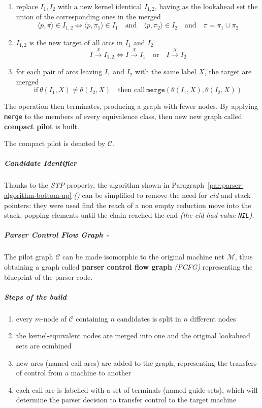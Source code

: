 \documentclass[english]{article}
\begin{document}
\begin{enumerate}
  \item replace \mstates \(I_1, I_2\) with a new kernel identical \mstate \(I_{1,2}\), having as the lookahead set the union of the corresponding ones in the merged \mstates
        \[ \langle p, \pi \rangle \in I_{1, 2} \iff \langle p, \pi_1 \rangle \in I_1 \quad \text{and} \quad \langle p, \pi_2 \rangle \in I_2 \quad \text{and} \quad \pi = \pi_1 \cup \pi_2 \]
  \item \mstate \(I_{1,2}\) is the new target of all arcs in \(I_1\) and \(I_2\)
        \[ I \xrightarrow{X} I_{1,2} \iff I \xrightarrow{X} I_1 \quad \text{or} \quad I \xrightarrow{X} I_2 \]
  \item for each pair of arcs leaving \(I_1\) and \(I_2\) with the same label \(X\), the target \mstates are merged
        \[ \text{if} \ \theta(I_1, X) \neq \theta(I_2, X) \quad \text{then call} \ \texttt{merge}(\theta(I_1, X), \theta(I_2, X)) \]
\end{enumerate}

The operation then terminates, producing a graph with fewer nodes.
By applying \texttt{merge} to the members of every equivalence class, then new new graph called \textbf{compact pilot} is built.

The compact pilot is denoted by \(\mathcal{C}\).

\subparagraph*{Candidate Identifier}

Thanks to the \textit{STP} property, the algorithm shown in Paragraph~\ref{par:parser-algorithm-bottom-up} \textit{()} can be simplified to remove the need for \textit{cid} and stack pointers:
they were used find the reach of a non empty reduction move into the stack, popping elements until the chain reached the end \textit{(the \textit{cid} had value \texttt{NIL})}.

\subparagraph*{Parser Control Flow Graph - \PCFG}

The pilot graph \(\mathcal{C}\) can be made isomorphic to the original machine net \(\mathcal{M}\), thus obtaining a graph called \textbf{parser control flow graph} \textit{(PCFG)} representing the blueprint of the parser code.

\subparagraph*{Steps of the build}

\begin{enumerate}
  \item every \(m\)-node of \(\mathcal{C}\) containing \(n\) candidates is split in \(n\) different nodes
  \item the kernel-equivalent nodes are merged into one and the original lookahead sets are combined
  \item new arcs (named call arcs) are added to the graph, representing the transfers of control from a machine to another
  \item each call arc is labelled with a set of terminals (named guide sets), which will determine the parser decision to transfer control to the target machine
\end{enumerate}
\end{document}
